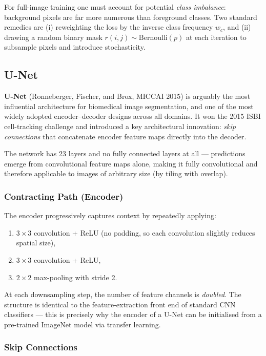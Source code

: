 \documentclass[11pt,a4paper]{article}
\newcommand{\term}[1]{\textcolor{DefGreen}{\textbf{#1}}}
\begin{document}
For full-image training one must account for potential \emph{class imbalance}: background pixels are far more numerous than foreground classes. Two standard remedies are (i) reweighting the loss by the inverse class frequency $w_c$, and (ii) drawing a random binary mask $r(i,j) \sim \text{Bernoulli}(p)$ at each iteration to subsample pixels and introduce stochasticity.

\subsection{U-Net}
\label{sec:unet}

\term{U-Net} (Ronneberger, Fischer, and Brox, MICCAI 2015) is arguably the most influential architecture for biomedical image segmentation, and one of the most widely adopted encoder--decoder designs across all domains. It won the 2015 ISBI cell-tracking challenge and introduced a key architectural innovation: \emph{skip connections} that concatenate encoder feature maps directly into the decoder.

The network has 23 layers and no fully connected layers at all — predictions emerge from convolutional feature maps alone, making it fully convolutional and therefore applicable to images of arbitrary size (by tiling with overlap).

\subsubsection{Contracting Path (Encoder)}

The encoder progressively captures context by repeatedly applying:
\begin{enumerate}
  \item $3\times 3$ convolution + ReLU (no padding, so each convolution slightly reduces spatial size),
  \item $3\times 3$ convolution + ReLU,
  \item $2\times 2$ max-pooling with stride 2.
\end{enumerate}
At each downsampling step, the number of feature channels is \emph{doubled}. The structure is identical to the feature-extraction front end of standard CNN classifiers — this is precisely why the encoder of a U-Net can be initialised from a pre-trained ImageNet model via transfer learning.

\subsubsection{Skip Connections}
\end{document}
